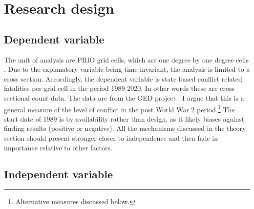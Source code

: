 \documentclass[12pt]{article}
\begin{document}


\section{Research design}

\subsection{Dependent variable}

The unit of analysis are PRIO grid cells, which are one degree by one degree
cells \citep{Tollefsen2012}. Due to the explanatory variable being
time-invariant, the analysis is limited to a cross section. Accordingly, the
dependent variable is state based conflict related fatalities per grid cell in
the period 1989-2020. In other words these are cross sectional count data. The
data are from the GED project \citep{Sundberg2013}. I argue that this is a
general measure of the level of conflict in the post World War 2
period.\footnote{Alternative measures discussed below.} The start date of 1989 is by
availability rather than design, as it likely biases against finding results
(positive or negative). All the mechanisms discussed in the theory section
should present stronger closer to independence and then fade in importance
relative to other factors. 



\subsection{Independent variable}
\end{document}
